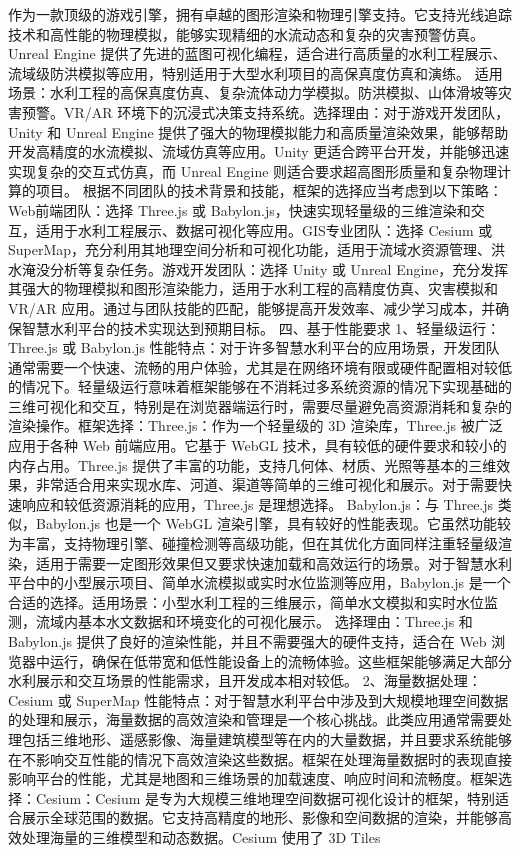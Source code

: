 作为一款顶级的游戏引擎，拥有卓越的图形渲染和物理引擎支持。它支持光线追踪技术和高性能的物理模拟，能够实现精细的水流动态和复杂的灾害预警仿真。Unreal Engine 提供了先进的蓝图可视化编程，适合进行高质量的水利工程展示、流域级防洪模拟等应用，特别适用于大型水利项目的高保真度仿真和演练。 适用场景：水利工程的高保真度仿真、复杂流体动力学模拟。防洪模拟、山体滑坡等灾害预警。VR/AR 环境下的沉浸式决策支持系统。选择理由：对于游戏开发团队，Unity 和 Unreal Engine 提供了强大的物理模拟能力和高质量渲染效果，能够帮助开发高精度的水流模拟、流域仿真等应用。Unity 更适合跨平台开发，并能够迅速实现复杂的交互式仿真，而 Unreal Engine 则适合要求超高图形质量和复杂物理计算的项目。 根据不同团队的技术背景和技能，框架的选择应当考虑到以下策略：Web前端团队：选择 Three.js 或 Babylon.js，快速实现轻量级的三维渲染和交互，适用于水利工程展示、数据可视化等应用。GIS专业团队：选择 Cesium 或 SuperMap，充分利用其地理空间分析和可视化功能，适用于流域水资源管理、洪水淹没分析等复杂任务。游戏开发团队：选择 Unity 或 Unreal Engine，充分发挥其强大的物理模拟和图形渲染能力，适用于水利工程的高精度仿真、灾害模拟和 VR/AR 应用。通过与团队技能的匹配，能够提高开发效率、减少学习成本，并确保智慧水利平台的技术实现达到预期目标。 四、基于性能要求 1、轻量级运行：Three.js 或 Babylon.js 性能特点：对于许多智慧水利平台的应用场景，开发团队通常需要一个快速、流畅的用户体验，尤其是在网络环境有限或硬件配置相对较低的情况下。轻量级运行意味着框架能够在不消耗过多系统资源的情况下实现基础的三维可视化和交互，特别是在浏览器端运行时，需要尽量避免高资源消耗和复杂的渲染操作。框架选择：Three.js：作为一个轻量级的 3D 渲染库，Three.js 被广泛应用于各种 Web 前端应用。它基于 WebGL 技术，具有较低的硬件要求和较小的内存占用。Three.js 提供了丰富的功能，支持几何体、材质、光照等基本的三维效果，非常适合用来实现水库、河道、渠道等简单的三维可视化和展示。对于需要快速响应和较低资源消耗的应用，Three.js 是理想选择。 Babylon.js：与 Three.js 类似，Babylon.js 也是一个 WebGL 渲染引擎，具有较好的性能表现。它虽然功能较为丰富，支持物理引擎、碰撞检测等高级功能，但在其优化方面同样注重轻量级渲染，适用于需要一定图形效果但又要求快速加载和高效运行的场景。对于智慧水利平台中的小型展示项目、简单水流模拟或实时水位监测等应用，Babylon.js 是一个合适的选择。适用场景：小型水利工程的三维展示，简单水文模拟和实时水位监测，流域内基本水文数据和环境变化的可视化展示。 选择理由：Three.js 和 Babylon.js 提供了良好的渲染性能，并且不需要强大的硬件支持，适合在 Web 浏览器中运行，确保在低带宽和低性能设备上的流畅体验。这些框架能够满足大部分水利展示和交互场景的性能需求，且开发成本相对较低。 2、海量数据处理：Cesium 或 SuperMap 性能特点：对于智慧水利平台中涉及到大规模地理空间数据的处理和展示，海量数据的高效渲染和管理是一个核心挑战。此类应用通常需要处理包括三维地形、遥感影像、海量建筑模型等在内的大量数据，并且要求系统能够在不影响交互性能的情况下高效渲染这些数据。框架在处理海量数据时的表现直接影响平台的性能，尤其是地图和三维场景的加载速度、响应时间和流畅度。框架选择：Cesium：Cesium 是专为大规模三维地理空间数据可视化设计的框架，特别适合展示全球范围的数据。它支持高精度的地形、影像和空间数据的渲染，并能够高效处理海量的三维模型和动态数据。Cesium 使用了 3D Tiles 